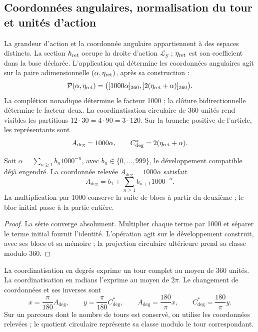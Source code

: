 \subsection{Coordonnées angulaires, normalisation du tour et unités d'action}
\label{sec:ii-angulos}

La grandeur d’action et la coordonnée angulaire appartiennent à des espaces
distincts. La section \(\hbar_{\rm ret}\) occupe la droite d’action
\(\mathcal L_S\) ; \(\eta_{\rm ret}\) est son coefficient dans la base
déclarée. L’application qui détermine les coordonnées angulaires agit sur la paire adimensionnelle
\((\alpha,\eta_{\rm ret})\), après sa construction :
\begin{equation}
 \mathcal P(\alpha,\eta_{\rm ret})
 =\bigl([1000\alpha]_{360},[2(\eta_{\rm ret}+\alpha)]_{360}\bigr).
 \label{eq:ii-par-angular}
\end{equation}
La complétion nonadique détermine le facteur 1000 ; la clôture
bidirectionnelle détermine le facteur deux. La coordinatisation circulaire de 360
unités rend visibles les partitions
\(12\cdot30=4\cdot90=3\cdot120\). Sur la branche positive de
l’article, les représentants sont
\[
 A_{\deg}=1000\alpha,\qquad
 C^*_{\deg}=2(\eta_{\rm ret}+\alpha).
\]

\begin{proposition}
\label{prop:ii-desplazamiento-angular}
Soit \(\alpha=\sum_{n\geq1}b_n1000^{-n}\), avec
\(b_n\in\{0,\ldots,999\}\), le développement compatible déjà engendré.
La coordonnée relevée \(A_{\deg}=1000\alpha\) satisfait
\[
 A_{\deg}=b_1+\sum_{n\geq1}b_{n+1}1000^{-n}.
\]
La multiplication par 1000 conserve la suite de blocs à partir du deuxième ;
le bloc initial passe à la partie entière.
\end{proposition}
\begin{proof}
La série converge absolument. Multiplier chaque terme par 1000
et séparer le terme initial fournit l’identité. L’opération
agit sur le développement construit, avec ses blocs et sa mémoire ;
la projection circulaire ultérieure prend sa classe modulo 360.
\end{proof}

\begin{definition}
La coordinatisation en degrés exprime un tour complet au moyen de 360 unités.
La coordinatisation en radians l’exprime au moyen de \(2\pi\). Le changement de
coordonnées et ses inverses sont
\[
 x=\frac{\pi}{180}A_{\deg},\qquad
 y=\frac{\pi}{180}C^*_{\deg},\qquad
 A_{\deg}=\frac{180}{\pi}x,\qquad
 C^*_{\deg}=\frac{180}{\pi}y.
\]
Sur un parcours dont le nombre de tours est conservé, on utilise les
coordonnées relevées ; le quotient circulaire représente sa classe modulo
le tour correspondant.
\end{definition}

